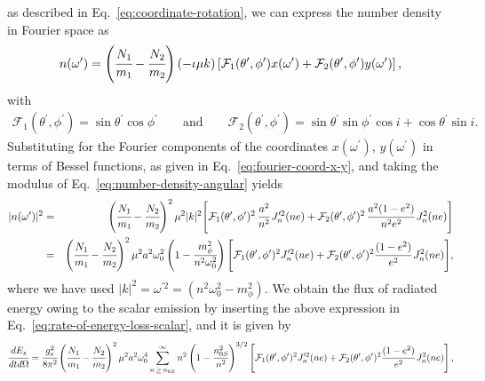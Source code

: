 \documentclass[aps,prd]{revtex4-2}
\begin{document}
\noindent as described in Eq.~\eqref{eq:coordinate-rotation}, we can express the number density in Fourier space as
\begin{eqnarray}\label{eq:number-density-angular}
    n(\omega^{\prime}) = \left( \cfrac{N_{1}}{m_{1}} - \cfrac{N_{2}}{m_{2}} \right) \left( - \iota \mu k \right)\left[ \mathcal{F}_{1} (\theta^\prime, \phi^\prime) x(\omega^\prime) +  \mathcal{F}_{2} (\theta^\prime, \phi^\prime) y(\omega^\prime) \right], 
\end{eqnarray}
with
\begin{eqnarray}\label{eq:x-y-coeff-angular}
    \mathcal{F}_{1} (\theta^\prime, \phi^\prime) =  \sin{\theta^{\prime}}\cos{\phi^{\prime}} \qquad \text{and} \qquad \mathcal{F}_{2} (\theta^\prime, \phi^\prime) = \sin{\theta^{\prime}}\sin{\phi^{\prime}}\cos{i} + \cos{\theta^{\prime}}\sin{i}.
\end{eqnarray}
Substituting for the Fourier components of the coordinates $x(\omega^\prime)$, $y(\omega^\prime)$ in terms of Bessel functions, as given in Eq.~\eqref{eq:fourier-coord-x-y}, and taking the modulus of Eq.~\eqref{eq:number-density-angular} yields
\begin{eqnarray}\label{eq:number-density-squared-Bessel}
    |n(\omega^{\prime})|^{2} &=& \left(\cfrac{N_{1}}{m_{1}} - \cfrac{N_{2}}{m_{2}} \right)^{2}\mu^{2}|k|^{2} \Bigg[\mathcal{F}_1 (\theta^\prime, \phi^\prime)^2\, \cfrac{a^{2}}{n^{2}}\, J^{\prime 2}_{n} (ne) 
    + \mathcal{F}_2 (\theta^\prime, \phi^\prime)^2 \, \cfrac{a^{2}(1-e^{2})}{n^{2}e^{2}} \, J^{2}_{n}(ne) \Bigg] \nonumber\\
     &=&  \left(\cfrac{N_{1}}{m_{1}} - \cfrac{N_{2}}{m_{2}} \right)^{2}\mu^{2} a^{2} \omega_{0}^{2} \left(1 - \cfrac{m_{\phi}^2}{n^2\omega_{0}^2}\right) \Bigg [\mathcal{F}_{1} (\theta^\prime, \phi^\prime)^2  J^{\prime 2}_{n} (ne) + \mathcal{F}_2 (\theta^\prime, \phi^\prime)^{2} \cfrac{(1-e^{2})}{e^{2}}\,J^{2}_{n}(ne) \Bigg],
\end{eqnarray}
where we have used $|k|^2 = \omega^{\prime 2}  = (n^{2}\omega_{0}^{2} - m_{\phi}^{2})$. We obtain the flux of radiated energy owing to the scalar emission by inserting the above expression in Eq.~\eqref{eq:rate-of-energy-loss-scalar}, and it is given by
\begin{eqnarray}\label{Eq:energy-flux-theta-phi-e}
    \cfrac{dE_{s}}{dt d\Omega} 
    = \cfrac{g_{s}^{2}}{8\pi^{2}} \left( \cfrac{N_{1}}{m_{1}} - \cfrac{N_{2}}{m_{2}} \right)^{2}\mu^{2} a^{2} \omega_{0}^{4} 
    \sum_{n\,\geq\, n_{0S}}^{\infty}n^{2} \left(1 - \cfrac{n_{0S}^{2}}{n^2} \right)^{3/2} \left[\mathcal{F}_{1} (\theta^\prime, \phi^\prime)^2  J^{\prime 2}_{n}(ne) + \mathcal{F}_2 (\theta^\prime, \phi^\prime)^2 \cfrac{(1-e^{2})}{e^{2}}\,J^{2}_{n}(ne)  \right],
\end{eqnarray}
\end{document}
